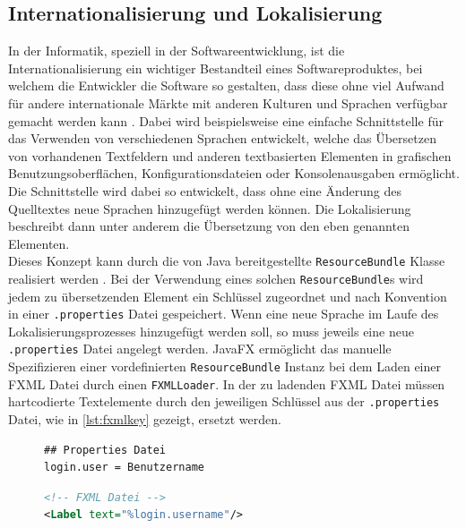 \subsection{Internationalisierung und Lokalisierung}
In der Informatik, speziell in der Softwareentwicklung, ist die Internationalisierung ein wichtiger Bestandteil eines Softwareproduktes, bei welchem die Entwickler die Software so gestalten, dass diese ohne viel Aufwand für andere internationale Märkte mit anderen Kulturen und Sprachen verfügbar gemacht werden kann \cite{Reineke2005}. Dabei wird beispielsweise eine einfache Schnittstelle für das Verwenden von verschiedenen Sprachen entwickelt, welche das Übersetzen von vorhandenen Textfeldern und anderen textbasierten Elementen in grafischen Benutzungsoberflächen, Konfigurationsdateien oder Konsolenausgaben ermöglicht. Die Schnittstelle wird dabei so entwickelt, dass ohne eine Änderung des Quelltextes neue Sprachen hinzugefügt werden können. Die Lokalisierung beschreibt dann unter anderem die Übersetzung von den eben genannten Elementen.\\
Dieses Konzept kann durch die von Java bereitgestellte \texttt{ResourceBundle} Klasse realisiert werden \cite{Deitsch2001}. Bei der Verwendung eines solchen \texttt{ResourceBundle}s wird jedem zu übersetzenden Element ein Schlüssel zugeordnet und nach Konvention in einer \texttt{.properties} Datei gespeichert. Wenn eine neue Sprache im Laufe des Lokalisierungsprozesses hinzugefügt werden soll, so muss jeweils eine neue \texttt{.properties} Datei angelegt werden. JavaFX ermöglicht das manuelle Spezifizieren einer vordefinierten \texttt{ResourceBundle} Instanz bei dem Laden einer FXML Datei durch einen \texttt{FXMLLoader}.
In der zu ladenden FXML Datei müssen hartcodierte Textelemente durch den jeweiligen Schlüssel aus der \texttt{.properties} Datei, wie in \autoref{lst:fxmlkey} gezeigt, ersetzt werden.
\begin{figure}[H]
	\noindent
	\begin{adjustbox}{minipage=[t]{.45\linewidth},gstore totalheight=\heightone,margin=\fboxsep+\fboxrule}
		\begin{lstlisting}
## Properties Datei
login.user = Benutzername
		\end{lstlisting}
	\end{adjustbox}\hfill
	\begin{adjustbox}{minipage=[t][\heightone]{0.5\linewidth}}
		\begin{lstlisting}[language=XML]
<!-- FXML Datei -->
<Label text="%login.username"/>
		\end{lstlisting}
	\end{adjustbox}
	\label{lst:fxmlkey}
\end{figure}
